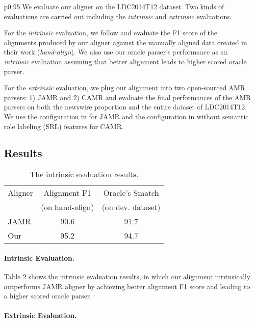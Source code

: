 \documentclass[11pt,a4paper]{article}
\begin{document}
\begin{table}[t]
\begin{tabular}{p{}}
We evaluate our aligner on the LDC2014T12 dataset.
Two kinds of evaluations are carried out including the {\it intrinsic} and {\it extrinsic} evaluations.

For the {\it intrinsic} evaluation, we follow \citet{flanigan-EtAl:2014:P14-1}
and evaluate the F1 score of the alignments produced by our aligner
against the manually aligned data created in their work
({\it hand-align}).
We also use our oracle parser's performance as an {\it intrinsic} evaluation
assuming that better alignment leads to higher scored oracle parser.

For the {\it extrinsic} evaluation, we plug our alignment into two open-sourced AMR parsers: 1) JAMR \citep{flanigan-EtAl:2014:P14-1,flanigan-EtAl:2016:SemEval}
and 2) CAMR \cite{wang-xue-pradhan:2015:NAACL-HLT,wang-xue-pradhan:2015:ACL-IJCNLP} and evaluate the final performances of the AMR parsers
on both the newswire proportion and the entire dataset of LDC2014T12.
We use the configuration in \citet{flanigan-EtAl:2016:SemEval} for JAMR 
and the configuration in \citet{wang-xue-pradhan:2015:ACL-IJCNLP} without 
semantic role labeling (SRL) features for CAMR.

\subsection{Results}

\begin{table}[t]
	\centering
	\begin{tabular}{lcc}
		\hline
		Aligner & Alignment F1 & Oracle's Smatch\\
		& (on hand-align) & (on dev. dataset)\\
		\hline
		JAMR & 90.6 & 91.7 \\
		Our & 95.2 & 94.7 \\
		\hline
	\end{tabular}
	\caption{The intrinsic evaluation results.}\label{tbl:int-eval}
\end{table}

\paragraph{Intrinsic Evaluation.}
Table \ref{tbl:int-eval} shows the intrinsic evaluation
results, in which our alignment
intrinsically outperforms JAMR aligner by
achieving better alignment F1 score and leading
to a higher scored oracle parser.

\paragraph{Extrinsic Evaluation.}


\end{tabular}
\end{table}
\end{document}
